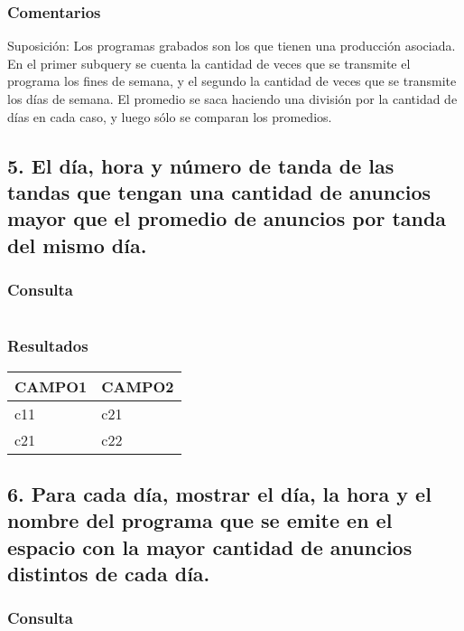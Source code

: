 \subsubsection*{Comentarios}
Suposici\'on: Los programas grabados son los que tienen una producci\'on asociada. \\

En el primer subquery se cuenta la cantidad de veces que se transmite el programa los fines de semana, y el segundo la cantidad de veces que se transmite los d\'ias de semana. El promedio se saca haciendo una divisi\'on por la cantidad de d\'ias en cada caso, y luego s\'olo se comparan los promedios.


\subsection*{5. \normalsize{El d\'ia, hora y n\'umero de tanda de las tandas que tengan una cantidad de anuncios mayor que el promedio de anuncios por tanda del mismo d\'ia.}}

\subsubsection*{Consulta}
\begin{lstlisting} 

\end{lstlisting}

\subsubsection*{Resultados}
\begin{tabular}{|l|l|}
  \hline
    \bf{CAMPO1} & \bf{CAMPO2} \\ 
  \hline
    c11 & c21 \\ 
    c21 & c22 \\
  \hline
\end{tabular} 

\subsection*{6. \normalsize{Para cada d\'ia, mostrar el d\'ia, la hora y el nombre del programa que se emite en el espacio con la mayor cantidad de anuncios distintos de cada d\'ia.}}

\subsubsection*{Consulta}
\begin{lstlisting} 

\end{lstlisting}

